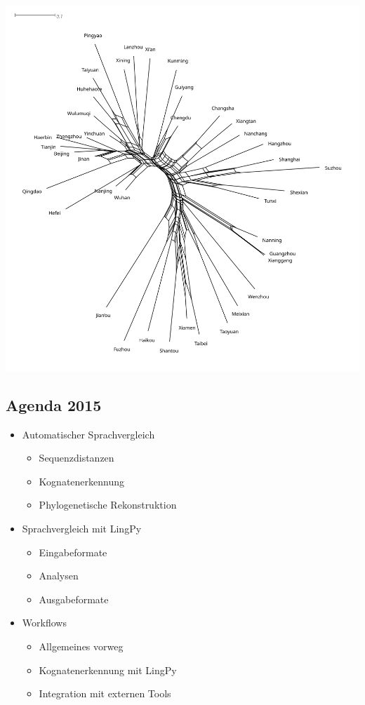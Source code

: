 \href{../code/data/chinese_network.svg}{\includegraphics{../code/data/chinese_network.svg}}

\subsection{\texorpdfstring{{Agenda 2015}}{Agenda 2015}}

\begin{itemize}
\itemsep1pt\parskip0pt
\item
  {Automatischer Sprachvergleich}

  \begin{itemize}
  \itemsep1pt\parskip0pt
  \item
    {Sequenzdistanzen}
  \item
    {Kognatenerkennung}
  \item
    {Phylogenetische Rekonstruktion}
  \end{itemize}
\item
  {Sprachvergleich mit LingPy}

  \begin{itemize}
  \itemsep1pt\parskip0pt
  \item
    {Eingabeformate}
  \item
    {Analysen}
  \item
    {Ausgabeformate}
  \end{itemize}
\item
  {Workflows}

  \begin{itemize}
  \itemsep1pt\parskip0pt
  \item
    {Allgemeines vorweg}
  \item
    {Kognatenerkennung mit LingPy}
  \item
    {Integration mit externen Tools}
  \end{itemize}
\end{itemize}

